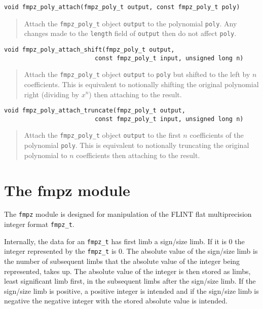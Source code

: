 \documentclass[a4paper,10pt]{article}
\newcommand{\code}{\lstinline}
\begin{document}
\begin{lstlisting}
void fmpz_poly_attach(fmpz_poly_t output, const fmpz_poly_t poly)
\end{lstlisting}
\begin{quote}
Attach the \code{fmpz_poly_t} object \code{output} to the polynomial \code{poly}. Any changes made to the \code{length} field of \code{output} then do not affect \code{poly}.
\end{quote}

\begin{lstlisting}
void fmpz_poly_attach_shift(fmpz_poly_t output, 
                         const fmpz_poly_t input, unsigned long n)
\end{lstlisting}
\begin{quote}
Attach the \code{fmpz_poly_t} object \code{output} to \code{poly} but shifted to the left by $n$ coefficients. This is equivalent to notionally shifting the original polynomial right (dividing by $x^n$) then attaching to the result.
\end{quote}

\begin{lstlisting}
void fmpz_poly_attach_truncate(fmpz_poly_t output, 
                         const fmpz_poly_t input, unsigned long n)
\end{lstlisting}
\begin{quote}
Attach the \code{fmpz_poly_t} object \code{output} to the first $n$ coefficients of the polynomial \code{poly}. This is equivalent to notionally truncating the original polynomial to $n$ coefficients then attaching to the result.
\end{quote}

\section{The fmpz module}
The \code{fmpz} module is designed for manipulation of the FLINT flat multiprecision integer format \code{fmpz_t}. 

Internally, the data for an \code{fmpz_t} has first limb a sign/size limb. If it is 0 the integer represented by the \code{fmpz_t} is 0. The absolute value of the sign/size limb is the number of subsequent limbs that the absolute value of the integer being represented, takes up. The absolute value of the integer is then stored as limbs, least significant limb first, in the subsequent limbs after the sign/size limb. If the sign/size limb is positive, a positive integer is intended and if the sign/size limb is negative the negative integer with the stored absolute value is intended.
\end{document}
